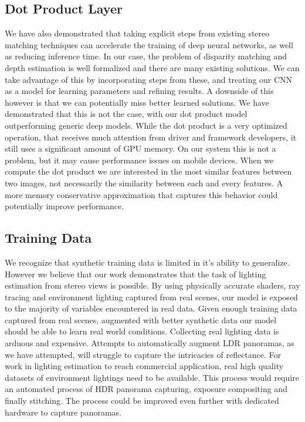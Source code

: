 \documentclass[ %
                    author={Gavin Parker},
                supervisor={Dr. Neill Campbell},
                    degree={MEng},
                     title={Deep Siamese Networks for Illumination Estimation from Stereo Images},
                  subtitle={},
                      type={Research},
                      year={2018} ]{dissertation}
\begin{document}
\subsection{Dot Product Layer}
We have also demonstrated that taking explicit steps from existing stereo matching techniques can accelerate the training of deep neural networks, as well as reducing inference time. In our case, the problem of disparity matching and depth estimation is well formalized and there are many existing solutions. We can take advantage of this by incorporating steps from these, and treating our CNN as a model for learning parameters and refining results. A downside of this however is that we can potentially miss better learned solutions. We have demonstrated that this is not the case, with our dot product model outperforming generic deep models. While the dot product is a very optimized operation, that receives much attention from driver and framework developers, it still uses a significant amount of GPU memory. On our system this is not a problem, but it may cause performance issues on mobile devices. When we compute the dot product we are interested in the most similar features between two images, not necessarily the similarity between each and every features. A more memory conservative approximation that captures this behavior could potentially improve performance.
\subsection{Training Data}
We recognize that synthetic training data is limited in it's ability to generalize. However we believe that our work demonstrates that the task of lighting estimation from stereo views is possible. By using physically accurate shaders, ray tracing and environment lighting captured from real scenes, our model is exposed to the majority of variables encountered in real data. Given enough training data captured from real scenes, augmented with better synthetic data our model should be able to learn real world conditions. Collecting real lighting data is arduous and expensive. Attempts to automatically augment LDR panoramas, as we have attempted, will struggle to capture the intricacies of reflectance. For work in lighting estimation to reach commercial application, real high quality datasets of environment lightings need to be available. This process would require an automated process of HDR panorama capturing, exposure compositing and finally stitching. The process could be improved even further with dedicated hardware to capture panoramas.
\end{document}
